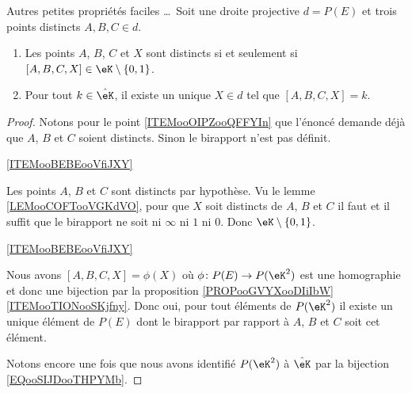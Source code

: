 \begin{proposition}
    Autres petites propriétés faciles \ldots\ Soit une droite projective \( d=P(E)\) et trois points distincts \( A,B,C\in d\).
    \begin{enumerate}
        \item       \label{ITEMooOIPZooQFFYIn}
            Les points \( A\), \( B\), \( C\) et \( X\) sont distincts si et seulement si \( [A,B,C,X]\in \eK\setminus\{ 0,1 \}\).
        \item       \label{ITEMooBEBEooVfiJXY}
            Pour tout \( k\in \hat\eK\), il existe un unique \( X\in d\) tel que \( [A,B,C,X]=k\).
    \end{enumerate}
\end{proposition}

\begin{proof}
    Notons pour le point \ref{ITEMooOIPZooQFFYIn} que l'énoncé demande déjà que \( A\), \( B\) et \( C\) soient distincts. Sinon le birapport n'est pas définit.
    \begin{subproof}
        \item[\ref{ITEMooBEBEooVfiJXY}]

            Les points \( A\), \( B\) et \( C\) sont distincts par hypothèse. Vu le lemme \ref{LEMooCOFTooVGKdVO}, pour que \( X\) soit distincts de \( A\), \( B\) et \( C\) il faut et il suffit que le birapport ne soit ni \( \infty\) ni \( 1\) ni \( 0\). Donc \( \eK\setminus\{ 0,1 \}\).

        \item[\ref{ITEMooBEBEooVfiJXY}]

            Nous avons \( [A,B,C,X]=\phi(X)\) où \( \phi\colon P(E)\to P(\eK^2)\) est une homographie et donc une bijection par la proposition \ref{PROPooGVYXooDIiIbW}\ref{ITEMooTIONooSKjfny}. Donc oui, pour tout éléments de \( P(\eK^2)\) il existe un unique élément de \( P(E)\) dont le birapport par rapport à \( A\), \( B\) et \( C\) soit cet élément.

    \end{subproof}
    Notons encore une fois que nous avons identifié \( P(\eK^2)\) à \( \hat\eK\) par la bijection \eqref{EQooSIJDooTHPYMb}.
\end{proof}

